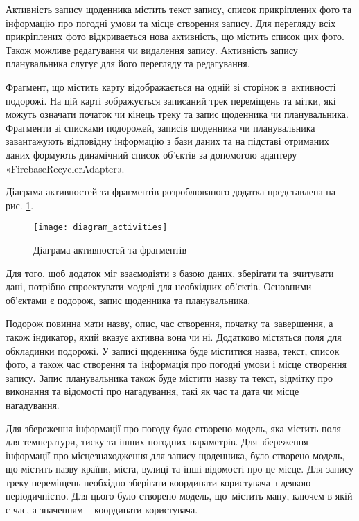 \documentclass[../main.tex]{subfiles}
\begin{document}
Активність запису щоденника містить текст запису, список прикріплених фото та інформацію про погодні умови та місце створення запису. Для перегляду всіх прикріплених фото відкривається нова активність, що містить список цих фото. Також можливе редагування чи видалення запису. Активність запису планувальника слугує для його перегляду та редагування.

Фрагмент, що містить карту відображається на одній зі сторінок в~активності подорожі. На цій карті зображується записаний трек переміщень та мітки, які можуть означати початок чи кінець треку та запис щоденника чи планувальника. Фрагменти зі списками подорожей, записів щоденника чи планувальника завантажують відповідну інформацію з бази даних та на підставі отриманих даних формують динамічний список об'єктів за допомогою адаптеру «FirebaseRecyclerAdapter».

Діаграма активностей та фрагментів розроблюваного додатка представлена на рис. \ref{diagram:activities}.

\begin{figure}[H]
	\centering
	\texttt{[image: diagram\_activities]}
	\caption{Діаграма активностей та фрагментів}
	\label{diagram:activities}
\end{figure}

Для того, щоб додаток міг взаємодіяти з базою даних, зберігати та~зчитувати дані, потрібно спроектувати моделі для необхідних об'єктів. Основними об'єктами є подорож, запис щоденника та планувальника.

Подорож повинна мати назву, опис, час створення, початку та~завершення, а також індикатор, який вказує активна вона чи ні. Додатково містяться поля для обкладинки подорожі. У записі щоденника буде міститися назва, текст, список фото, а також час створення та~інформація про погодні умови і місце створення запису. Запис планувальника також буде містити назву та текст, відмітку про виконання та відомості про нагадування, такі як час та дата чи місце нагадування.

Для збереження інформації про погоду було створено модель, яка містить поля для температури, тиску та інших погодних параметрів. Для збереження інформації про місцезнаходження для запису щоденника, було створено модель, що містить назву країни, міста, вулиці та інші відомості про це місце. Для запису треку переміщень необхідно зберігати координати користувача з деякою періодичністю. Для цього було створено модель, що~містить мапу, ключем в якій є час, а значенням -- координати користувача.
\end{document}
